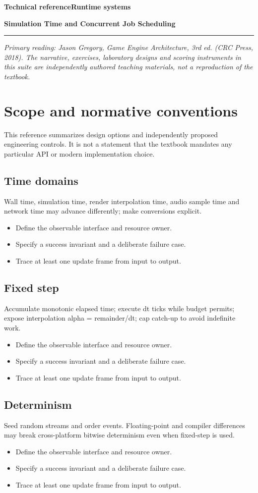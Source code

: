 \documentclass[11pt,letterpaper]{article}
\newcommand{\DocType}{Reference}
\newcommand{\SuiteHeading}[3]{%
\renewcommand{\DocType}{#2}%
{\small\bfseries\sffamily\color{EngineTeal}#2\hfill #3}\par\vspace{6pt}
{\LARGE\bfseries\color{EngineBlue}#1}\par\vspace{4pt}
{\color{EngineTeal}\rule{\linewidth}{1pt}}\par\vspace{7pt}}
\newcommand{\SourceNote}{\footnotesize\textit{Primary reading: Jason Gregory, \emph{Game Engine Architecture}, 3rd ed. (CRC Press, 2018). The narrative, exercises, laboratory designs and scoring instruments in this suite are independently authored teaching materials, not a reproduction of the textbook.}\normalsize\par}
\begin{document}
\SuiteHeading{Simulation Time and Concurrent Job Scheduling}{Technical reference}{Runtime systems}
\SourceNote
\section{Scope and normative conventions}
This reference summarizes design options and independently proposed engineering controls. It is not a statement that the textbook mandates any particular API or modern implementation choice.

\subsection{Time domains}
Wall time, simulation time, render interpolation time, audio sample time and network time may advance differently; make conversions explicit.

\begin{itemize}
\item Define the observable interface and resource owner.
\item Specify a success invariant and a deliberate failure case.
\item Trace at least one update frame from input to output.
\end{itemize}
\subsection{Fixed step}
Accumulate monotonic elapsed time; execute dt ticks while budget permits; expose interpolation alpha = remainder/dt; cap catch-up to avoid indefinite work.

\begin{itemize}
\item Define the observable interface and resource owner.
\item Specify a success invariant and a deliberate failure case.
\item Trace at least one update frame from input to output.
\end{itemize}
\subsection{Determinism}
Seed random streams and order events. Floating-point and compiler differences may break cross-platform bitwise determinism even when fixed-step is used.

\begin{itemize}
\item Define the observable interface and resource owner.
\item Specify a success invariant and a deliberate failure case.
\item Trace at least one update frame from input to output.
\end{itemize}
\end{document}
